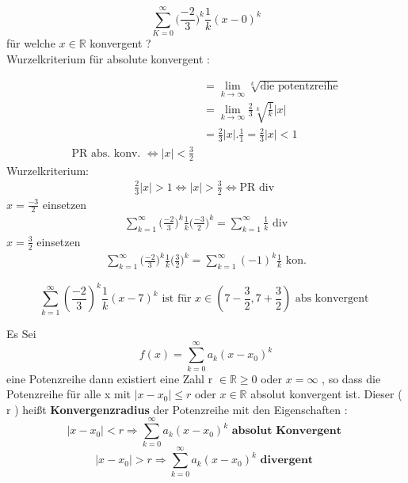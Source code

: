 \begin{example}
$$ \sum_{K=0}^{\infty}{\bigg( \frac{-2}{3}\bigg)^k}\frac{1}{k}(x-0)^k $$
für welche $ x \in \mathbb{R} $ konvergent ?\\
Wurzelkriterium für absolute konvergent : 

\begin{align*}
&= \lim_{k \to \infty}{\sqrt[k]{\text{die potentzreihe}}} \\ &= 
\lim_{k \to \infty}{\frac{2}{3} \sqrt[k]{\frac{1}{k}}}|x| \\ &= 
\frac{2}{3}|x|.\frac{1}{1}=\frac{2}{3}|x|<1\\
\text{PR  abs. konv. } \Leftrightarrow |x| < \frac{3}{2}
\end{align*}
Wurzelkriterium:
\begin{gather*}
\frac{2}{3}|x|>1 \Leftrightarrow |x|
> \frac{3}{2} \Leftrightarrow \text{PR div } 
\end{gather*}
$ x = \frac{-3}{2} $ einsetzen  
\begin{gather*}
\sum_{k=1}^{\infty}{\big(\frac{-2}{3}\big)^k} \frac{1}{k} \big( \frac{-3}{2} \big)^k = \sum_{k=1}^{\infty}{\frac{1}{k}} \text{ div}
\end{gather*}
$ x = \frac{3}{2} $ einsetzen  
\begin{gather*}
\sum_{k=1}^{\infty}{\big(\frac{-2}{3}\big)^k} \frac{1}{k} \big( \frac{3}{2} \big)^k = \sum_{k=1}^{\infty}{(-1)^k} \frac{1}{k} \text{ kon.}
\end{gather*}

\end{example}

\begin{example}
\[ \sum_{k=1}^{\infty}{(\frac{-2}{3})^k} \frac{1}{k} (x-7)^k  \text{ ist für } x \in (7- \frac{3}{2}, 7 + \frac{3}{2}) \text{ abs konvergent }\]
\end{example}

\begin{definition}
Es Sei $$f(x) = \sum_{k=0}^{\infty}{a_k(x-x_0)^k}$$ eine Potenzreihe dann existiert eine Zahl r $\in \mathbb{R} \geq 0 $ oder $ x = \infty $ , so dass die Potenzreihe für alle x mit $ |x-x_0| \leq r $ oder $x \in \mathbb{R} $ absolut konvergent ist. Dieser ( r )  heißt \textbf{Konvergenzradius} der Potenzreihe mit den Eigenschaften :
\[ |x - x_0| < r \Rightarrow  \sum_{k=0}^{\infty}{a_k(x-x_0)^k} \textbf{ absolut Konvergent } \]
\[ |x - x_0| > r \Rightarrow  \sum_{k=0}^{\infty}{a_k(x-x_0)^k} \textbf{ divergent } \]
\end{definition}

